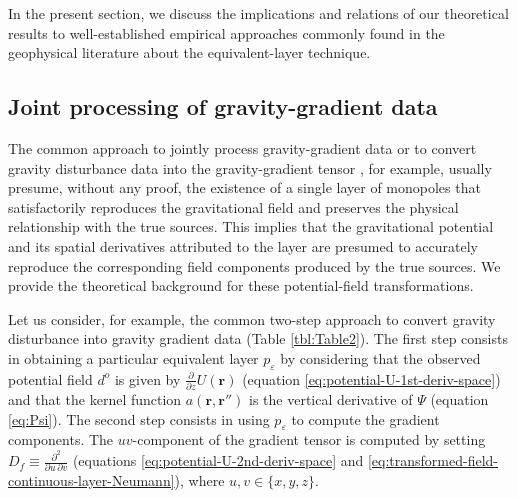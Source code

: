 \documentclass[manuscript,noblind]{geophysics}
\begin{document}
	In the present section, we discuss the implications and relations of our 
	theoretical results to well-established empirical approaches commonly found 
	in the geophysical literature about the equivalent-layer technique.
	
	\subsection{Joint processing of gravity-gradient data}
	
	The common approach to jointly process gravity-gradient data 
	\cite[e.g.,][]{boggs-dransfield2004,barnes_lumley2011, martinez_li_2016} or to convert gravity disturbance data into the 
	gravity-gradient tensor \cite[e.g.,][]{piauilino_etal2019_seg, oliveirajr_etal2023}, for example, 
	usually presume, without any proof, the existence of a single layer of 
	monopoles that satisfactorily reproduces the gravitational field and
	preserves the physical relationship with the true sources.
	This implies that the gravitational potential and its spatial derivatives attributed to the layer are presumed to 
	accurately reproduce the corresponding field components produced by the true sources.
	We provide the theoretical background for these potential-field transformations.
	
	Let us consider, for example, the common two-step approach to convert gravity disturbance into gravity
	gradient data (Table \ref{tbl:Table2}). The first step consists in obtaining a particular equivalent layer $p_{\varepsilon}$ 
	by considering that the observed potential field $d^{o}$ is given by $\tfrac{\partial}{\partial z} U(\mathbf{r})$ 
	(equation \ref{eq:potential-U-1st-deriv-space}) and that the kernel function 
	$a(\mathbf{r}, \mathbf{r}'')$ is the vertical derivative of $\Psi$ (equation \ref{eq:Psi}).
	The second step consists in using $p_{\varepsilon}$ to compute the gradient components.
	The $uv$-component of the gradient tensor is computed by setting $D_{f} \equiv \tfrac{\partial^{2}}{\partial u \, \partial v}$
	(equations \ref{eq:potential-U-2nd-deriv-space} and \ref{eq:transformed-field-continuous-layer-Neumann}),
	where $u, v \in \{ x, y, z \}$.
	
\end{document}
